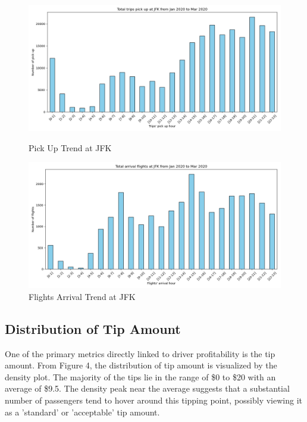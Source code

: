 \documentclass[11pt]{article}
\begin{document}
\begin{figure}[h]
    \centering
    \begin{minipage}{0.4\textwidth}
        \centering
        \includegraphics[width=1.0\linewidth]{plots/trips_pickup_count_JFK.png}
        \caption{Pick Up Trend at JFK}
    \end{minipage}
    \hfill
    \begin{minipage}{0.4\textwidth}
    \centering
    \includegraphics[width=1.0\linewidth]{plots/flights_arrival_count_JFK.png}
    \caption{Flights Arrival Trend at JFK}
    \end{minipage}
\end{figure}

\subsection{Distribution of Tip Amount}
One of the primary metrics directly linked to driver profitability is the tip amount. From Figure 4, the distribution of tip amount is visualized by the density plot. The majority of the tips lie in the range of \$0 to \$20 with an average of \$9.5. The density peak near the average suggests that a substantial number of passengers tend to hover around this tipping point, possibly viewing it as a 'standard' or 'acceptable' tip amount.
\end{document}
